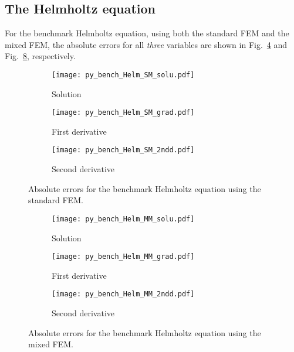 \documentclass[review,3p]{elsarticle}
\begin{document}
\newpage

\subsection{The Helmholtz equation}             \label{discretization_error_bench_Helm}

For the benchmark Helmholtz equation, using both the standard FEM and the mixed FEM, the absolute errors for all \emph{three} variables are shown in Fig.~\ref{py_bench_Helm_SM} and  Fig.~\ref{py_bench_Helm_MM}, respectively. 

\begin{figure}[!ht]
    \begin{subfigure}{5.5cm}
        \texttt{[image: py\_bench\_Helm\_SM\_solu.pdf]}
        \caption{Solution}
        \label{py_bench_Helm_SM_solu}
    \end{subfigure}
    \hspace{-0.2cm}
    \begin{subfigure}{5.5cm}
        \texttt{[image: py\_bench\_Helm\_SM\_grad.pdf]}
        \caption{First derivative}
        \label{py_bench_Helm_SM_grad}
    \end{subfigure}
    \hspace{-0.2cm}
    \begin{subfigure}{5.5cm}
        \texttt{[image: py\_bench\_Helm\_SM\_2ndd.pdf]}
        \caption{Second derivative}
        \label{py_bench_Helm_SM_2ndd}
    \end{subfigure}
\caption{Absolute errors for the benchmark Helmholtz equation using the standard FEM.}
\label{py_bench_Helm_SM}
\end{figure}

\begin{figure}[!ht]
    \begin{subfigure}{5.5cm}
        \texttt{[image: py\_bench\_Helm\_MM\_solu.pdf]}
        \caption{Solution}
        \label{py_bench_Helm_MM_solu}
    \end{subfigure}
    \hspace{-0.2cm}
    \begin{subfigure}{5.5cm}
        \texttt{[image: py\_bench\_Helm\_MM\_grad.pdf]}
        \caption{First derivative}
        \label{py_bench_Helm_MM_grad}
    \end{subfigure}
    \hspace{-0.2cm}
    \begin{subfigure}{5.5cm}
        \texttt{[image: py\_bench\_Helm\_MM\_2ndd.pdf]}
        \caption{Second derivative}
        \label{py_bench_Helm_MM_2ndd}
    \end{subfigure}
\caption{Absolute errors for the benchmark Helmholtz equation using the mixed FEM.}
\label{py_bench_Helm_MM}
\end{figure}
\end{document}
